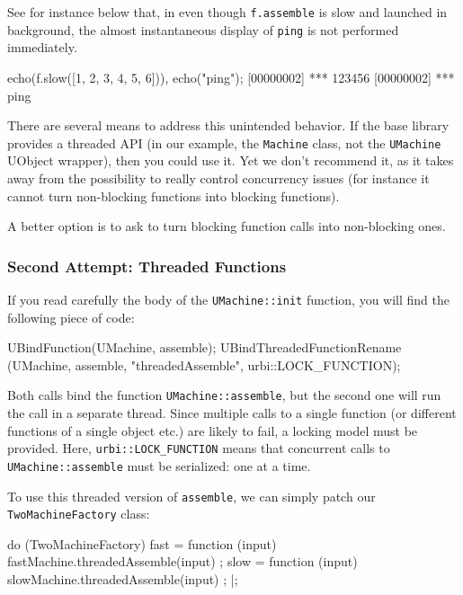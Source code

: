 See for instance below that, in even though \lstinline|f.assemble| is slow
and launched in background, the almost instantaneous display of
\lstinline|ping| is not performed immediately.

\begin{urbiscript}
echo(f.slow([1, 2, 3, 4, 5, 6])),
echo("ping");
[00000002] *** 123456
[00000002] *** ping
\end{urbiscript}

There are several means to address this unintended behavior.  If the base
library provides a threaded API (in our example, the \lstinline|Machine|
class, not the \lstinline|UMachine| UObject wrapper), then you could use
it.  Yet we don't recommend it, as it takes away from \urbi the possibility
to really control concurrency issues (for instance it cannot turn
non-blocking functions into blocking functions).

A better option is to ask \urbi to turn blocking function calls into
non-blocking ones.

\subsubsection{Second Attempt: Threaded Functions}

If you read carefully the body of the \lstinline|UMachine::init| function,
you will find the following piece of code:

\begin{cxx}
UBindFunction(UMachine, assemble);
UBindThreadedFunctionRename
  (UMachine, assemble, "threadedAssemble", urbi::LOCK_FUNCTION);
\end{cxx}

\noindent
Both calls bind the function \lstinline|UMachine::assemble|, but the second
one will run the call in a separate thread.  Since multiple calls to a
single function (or different functions of a single object etc.) are likely
to fail, a locking model must be provided.  Here,
\lstinline|urbi::LOCK_FUNCTION| means that concurrent calls to
\lstinline|UMachine::assemble| must be serialized: one at a time.

To use this threaded version of \lstinline|assemble|, we can simply patch
our \lstinline|TwoMachineFactory| class:

\begin{urbiscript}
do (TwoMachineFactory)
{
  fast = function (input) { fastMachine.threadedAssemble(input) };
  slow = function (input) { slowMachine.threadedAssemble(input) };
}|;
\end{urbiscript}

